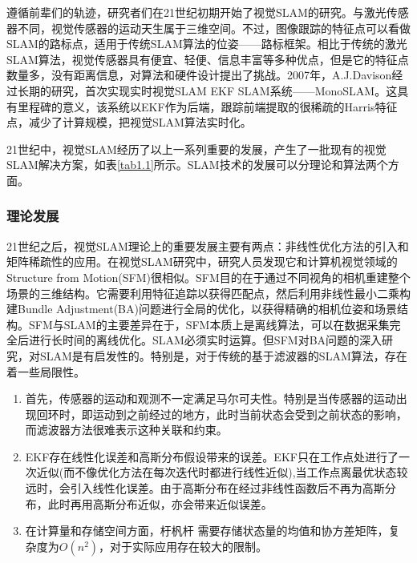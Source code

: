 遵循前辈们的轨迹，研究者们在21世纪初期开始了视觉SLAM的研究。与激光传感器不同，视觉传感器的运动天生属于三维空间。不过，图像跟踪的特征点可以看做SLAM的路标点，适用于传统SLAM算法的位姿——路标框架。相比于传统的激光SLAM算法，视觉传感器具有便宜、轻便、信息丰富等多种优点，但是它的特征点数量多，没有距离信息，对算法和硬件设计提出了挑战。2007年，A.J.Davison经过长期的研究，首次实现实时视觉SLAM EKF SLAM系统——MonoSLAM。这具有里程碑的意义，该系统以EKF作为后端，跟踪前端提取的很稀疏的Harris特征点，减少了计算规模，把视觉SLAM算法实时化。

21世纪中，视觉SLAM经历了以上一系列重要的发展，产生了一批现有的视觉SLAM解决方案，如表\ref{tab1.1}所示。SLAM技术的发展可以分理论和算法两个方面。

\subsubsection*{理论发展}
21世纪之后，视觉SLAM理论上的重要发展主要有两点：非线性优化方法的引入和矩阵稀疏性的应用。在视觉SLAM研究中，研究人员发现它和计算机视觉领域的Structure from Motion(SFM)很相似。SFM目的在于通过不同视角的相机重建整个场景的三维结构。它需要利用特征追踪以获得匹配点，然后利用非线性最小二乘构建Bundle Adjustment(BA)问题进行全局的优化，以获得精确的相机位姿和场景结构\upcite{}。SFM与SLAM的主要差异在于，SFM本质上是离线算法，可以在数据采集完全后进行长时间的离线优化。SLAM必须实时运算。但SFM对BA问题的深入研究\upcite{}，对SLAM是有启发性的。特别是，对于传统的基于滤波器的SLAM算法，存在着一些局限性。
\begin{enumerate}[label={(\arabic*)}]
\item 首先，传感器的运动和观测不一定满足马尔可夫性。特别是当传感器的运动出现回环时，即运动到之前经过的地方，此时当前状态会受到之前状态的影响，而滤波器方法很难表示这种关联和约束。
\item EKF存在线性化误差和高斯分布假设带来的误差。EKF只在工作点处进行了一次近似(而不像优化方法在每次迭代时都进行线性近似),当工作点离最优状态较远时，会引入线性化误差。由于高斯分布在经过非线性函数后不再为高斯分布，此时再用高斯分布近似，亦会带来近似误差。
\item 在计算量和存储空间方面，杅杋杆 需要存储状态量的均值和协方差矩阵，复杂度为$O(n^2)$，对于实际应用存在较大的限制。
\end{enumerate}

